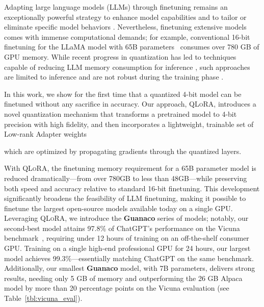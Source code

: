 Adapting large language models (LLMs) through finetuning remains an exceptionally powerful strategy to enhance model capabilities \citep{min2021metaicl, wei2021finetuned, ouyang2022training, wang2022super, wang2022self, liu2022few} and to tailor or eliminate specific model behaviors \citep{ouyang2022training,askell2021general,bai2022training}. Nevertheless, finetuning extensive models comes with immense computational demands; for example, conventional 16-bit finetuning for the LLaMA model with 65B parameters~\citep{touvron2023llama} consumes over 780 GB of GPU memory. While recent progress in quantization has led to techniques capable of reducing LLM memory consumption for inference \citep{dettmers2022llm, dettmers2022case, frantar2022gptq, xiao2022smoothquant}, such approaches are limited to inference and are not robust during the training phase \citep{wortsman2023stable}.

In this work, we show for the first time that a quantized 4-bit model can be finetuned without any sacrifice in accuracy. Our approach, \textsc{QLoRA}, introduces a novel quantization mechanism that transforms a pretrained model to 4-bit precision with high fidelity, and then incorporates a lightweight, trainable set of Low-rank Adapter weights \citep{hu2021lora} 

which are optimized by propagating gradients through the quantized layers.

With \textsc{QLoRA}, the finetuning memory requirement for a 65B parameter model is reduced dramatically—from over 780GB to less than 48GB—while preserving both speed and accuracy relative to standard 16-bit finetuning. This development significantly broadens the feasibility of LLM finetuning, making it possible to finetune the largest open-source models available today on a single GPU. Leveraging \textsc{QLoRA}, we introduce the \textbf{Guanaco} series of models; notably, our second-best model attains 97.8\% of ChatGPT’s performance on the Vicuna benchmark~\citep{vicuna2023}, requiring under 12 hours of training on an off-the-shelf consumer GPU. Training on a single high-end professional GPU for 24 hours, our largest model achieves 99.3\%—essentially matching ChatGPT on the same benchmark. Additionally, our smallest \textbf{Guanaco} model, with 7B parameters, delivers strong results, needing only 5 GB of memory and outperforming the 26 GB Alpaca model by more than 20 percentage points on the Vicuna evaluation (see Table~\ref{tbl:vicuna_eval}).


